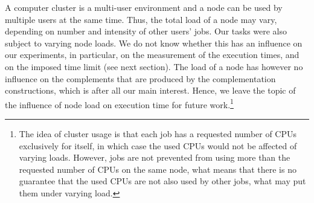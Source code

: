 A computer cluster is a multi-user environment and a node can be used by multiple users at the same time. Thus, the total load of a node may vary, depending on number and intensity of other users' jobs. Our tasks were also subject to varying node loads. We do not know whether this has an influence on our experiments, in particular, on the measurement of the execution times, and on the imposed time limit (see next section). The load of a node has however  no influence on the complements that are produced by the complementation constructions, which is after all our main interest. Hence, we leave the topic of the influence of node load on execution time for future work.\footnote{The idea of cluster usage is that each job has a requested number of CPUs exclusively for itself, in which case the used CPUs would not be affected of varying loads. However, jobs are not prevented from using more than the requested number of CPUs on the same node, what means that there is no guarantee that the used CPUs are not also used by other jobs, what may put them under varying load.}

